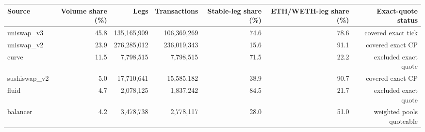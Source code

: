 \begin{tabular}{lrrrrrr}
\toprule
Source & Volume share (\%) & Legs & Transactions & Stable-leg share (\%) & ETH/WETH-leg share (\%) & Exact-quote status \\
\midrule
uniswap\_v3 & 45.8 & 135,165,909 & 106,369,269 & 74.6 & 78.6 & covered exact tick \\
uniswap\_v2 & 23.9 & 276,285,012 & 236,019,343 & 15.6 & 91.1 & covered exact CP \\
curve & 11.5 & 7,798,515 & 7,798,515 & 71.5 & 22.2 & excluded exact quote \\
sushiswap\_v2 & 5.0 & 17,710,641 & 15,585,182 & 38.9 & 90.7 & covered exact CP \\
fluid & 4.7 & 2,078,125 & 1,837,242 & 84.5 & 21.7 & excluded exact quote \\
balancer & 4.2 & 3,478,738 & 2,778,117 & 28.0 & 51.0 & weighted pools quoteable \\
\bottomrule
\end{tabular}
